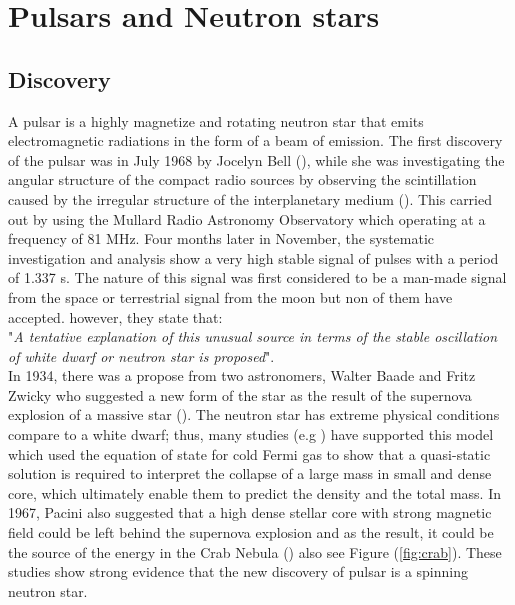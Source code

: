
\chapter{Pulsars and Neutron stars} %

\label{Chapter2} %


\section{Discovery}
\label{section1.1}
A pulsar is a highly magnetize and rotating neutron star that emits electromagnetic radiations in the form of a beam of emission. The first discovery of the pulsar was in July 1968 by Jocelyn Bell (\citet{hewish1968observation}), while she was investigating the angular structure of the compact radio sources by observing the scintillation caused by the irregular structure of the interplanetary medium (\citet{hewish1964detection}). This carried out by using the Mullard Radio Astronomy Observatory which operating at a frequency of 81 MHz. Four months later in November, the systematic investigation and analysis show a very high stable signal of pulses with a period of 1.337 s. The nature of this signal was first considered to be a man-made signal from the space or terrestrial signal from the moon but non of them have accepted. however, they state that:\\
"\textit{A tentative explanation of this unusual source in terms of the stable oscillation of white dwarf or neutron star is proposed}".\\
In 1934, there was a propose from two astronomers, Walter Baade and Fritz Zwicky who suggested a new form of the star as the result of the supernova explosion of a massive star (\citet{baade1934remarks}). The neutron star has extreme physical conditions compare to a white dwarf;  thus,  many studies (e.g \citet{oppenheimer1939massive}) have supported this model which used the equation of state for cold Fermi gas to show that a quasi-static solution is required to interpret the collapse of a large mass in small and dense core, which ultimately enable them to predict the density and the total mass. In 1967, Pacini also suggested that a high dense stellar core with strong magnetic field could be left behind the supernova explosion and as the result, it could be the source of the energy in the Crab Nebula (\citet{pacini1967energy}) also see Figure (\ref{fig:crab}). These studies show strong evidence that the new discovery of pulsar is a spinning neutron star.

